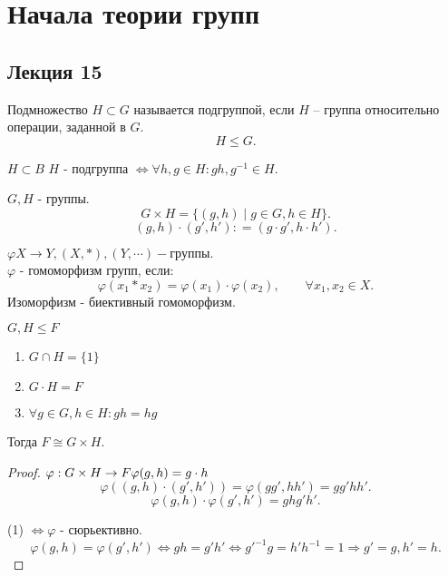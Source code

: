 \documentclass[12pt]{report}
\begin{document}
\chapter{Начала теории групп}
\section{Лекция 15}
\begin{defn}
    Подмножество $H \subset G$ называется подгруппой, если $H$ -- группа относительно операции, заданной в $G$.
    \[
    H \le G
    .\] 
\end{defn}
\begin{lm}
    $H \subset B$
    $H$ - подгруппа $\Leftrightarrow \forall h, g \in H: gh, g^{-1} \in  H$.
\end{lm}
\begin{st}
    $G, H$ - группы. 
    \[
	G \times H = \{(g, h) \mid g \in  G, h \in  H \}
    .\] 
    \[
     (g, h) \cdot (g', h') : = (g\cdot g', h\cdot h')
    .\] 
\end{st}
\begin{defn}
    $\varphi  X \to  Y , (X, *), (Y, \cdots) - группы.$\\
    $\varphi$ - гомоморфизм групп, если:
    \[
	\varphi(x_1 * x_2) = \varphi (x_1) \cdot \varphi(x_2) , \qquad \forall x_1, x_2 \in  X
    .\] 
    Изоморфизм - биективный гомоморфизм.
\end{defn}
\begin{lm}
    $G, H \le F$
    \begin{enumerate}
	\item $G \cap H  = \{1\}$
	\item $G \cdot H = F$
	\item $\forall g \in  G, h \in  H: gh = hg$
    \end{enumerate}
    Тогда $F \cong G \times H$.
\end{lm}
\begin{proof}
$
    \varphi : G\times H \to F \\ \varphi(g, h) = g \cdot h$
    \[
	\varphi ((g, h) \cdot (g', h')) = \varphi (gg', hh') = gg' hh'
    .\] 
    \[
	\varphi (g, h) \cdot \varphi (g', h') = gh g'h'
    .\] 

    (1) $\Leftrightarrow \varphi$ - сюрьективно.
    \[
	\varphi (g, h) = \varphi(g', h') \Leftrightarrow gh = g'h' \Leftrightarrow g'^{-1} g = h' h^{-1} = 1 \Rightarrow g' = g, h' = h
    .\] 
\end{proof}
\end{document}
